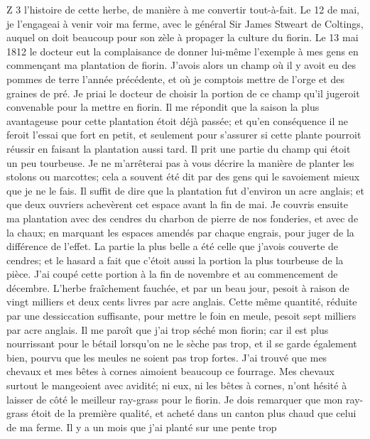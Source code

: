 Z 3\setcounter{page}{295} l'histoire de cette herbe, de manière à me convertir tout-à-fait. Le 12 de mai, je l'engageai à venir voir ma ferme, avec le général Sir James Stweart de Coltings, auquel on doit beaucoup pour son zèle à propager la culture du fiorin. Le 13 mai 1812 le docteur eut la complaisance de donner lui-même l'exemple à mes gens en commençant ma plantation de fiorin. J'avois alors un champ où il y avoit eu des pommes de terre l'année précédente, et où je comptois mettre de l'orge et des graines de pré. Je priai le docteur de choisir la portion de ce champ qu'il jugeroit convenable pour la mettre en fiorin. Il me répondit que la saison la plus avantageuse pour cette plantation étoit déjà passée; et qu'en conséquence il ne feroit l'essai que fort en petit, et seulement pour s'assurer si cette plante pourroit réussir en faisant la plantation aussi tard. Il prit une partie du champ qui étoit un peu tourbeuse. Je ne m'arrêterai pas à vous décrire la manière de planter les stolons ou marcottes; cela a souvent été dit par des gens qui le savoiement mieux que je ne le fais. Il suffit de dire que la plantation fut d'environ un acre anglais; et que deux ouvriers achevèrent cet espace avant la fin de mai. Je couvris ensuite ma plantation avec des\setcounter{page}{296} cendres du charbon de pierre de nos fonderies, et avec de la chaux; en marquant les espaces amendés par chaque engrais, pour juger de la différence de l'effet. La partie la plus belle a été celle que j'avois couverte de cendres; et le hasard a fait que c'étoit aussi la portion la plus tourbeuse de la pièce. J'ai coupé cette portion à la fin de novembre et au commencement de décembre. L'herbe fraîchement fauchée, et par un beau jour, pesoit à raison de vingt milliers et deux cents livres par acre anglais. Cette même quantité, réduite par une dessiccation suffisante, pour mettre le foin en meule, pesoit sept milliers par acre anglais. Il me paroît que j'ai trop séché mon fiorin; car il est plus nourrissant pour le bétail lorsqu'on ne le sèche pas trop, et il se garde également bien, pourvu que les meules ne soient pas trop fortes. J'ai trouvé que mes chevaux et mes bêtes à cornes aimoient beaucoup ce fourrage. Mes chevaux surtout le mangeoient avec avidité; ni eux, ni les bêtes à cornes, n'ont hésité à laisser de côté le meilleur ray-grass pour le fiorin. Je dois remarquer que mon ray-grass étoit de la première qualité, et acheté dans un canton plus chaud que celui de ma ferme. Il y a un mois que j'ai planté sur une pente trop
